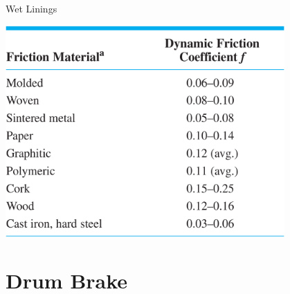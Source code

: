 \documentclass[10pt, svgnames]{beamer}
\begin{document}
\begin{frame}[label={sec:orgdec5aa2}]{Wet Linings}
\begin{center}
\includegraphics[width=0.8\textwidth]{./pictures/wet-materials.png}
\end{center}
\end{frame}

\section{Drum Brake}
\label{sec:orgcfecb26}
\end{document}
